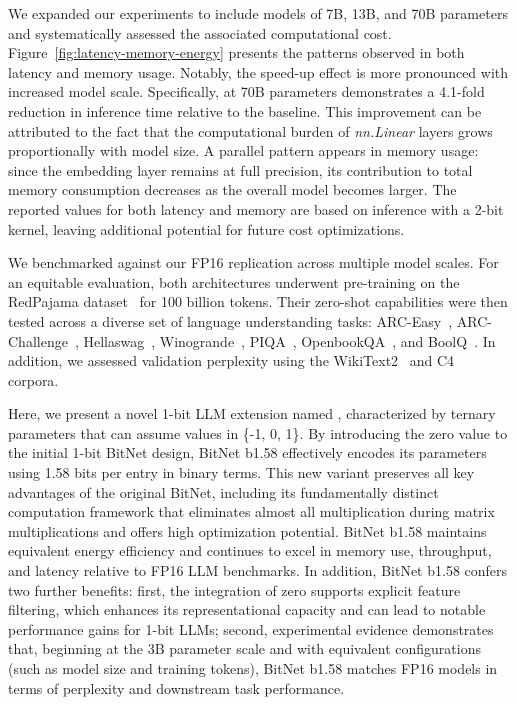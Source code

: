 We expanded our experiments to include models of 7B, 13B, and 70B parameters and systematically assessed the associated computational cost. Figure~\ref{fig:latency-memory-energy} presents the patterns observed in both latency and memory usage. Notably, the speed-up effect is more pronounced with increased model scale. Specifically,  at 70B parameters demonstrates a 4.1-fold reduction in inference time relative to the  baseline. This improvement can be attributed to the fact that the computational burden of \emph{nn.Linear} layers grows proportionally with model size. A parallel pattern appears in memory usage: since the embedding layer remains at full precision, its contribution to total memory consumption decreases as the overall model becomes larger. The reported values for both latency and memory are based on inference with a 2-bit kernel, leaving additional potential for future cost optimizations.

We benchmarked  against our FP16  replication across multiple model scales. For an equitable evaluation, both architectures underwent pre-training on the RedPajama dataset~\cite{redpajama} for 100 billion tokens. Their zero-shot capabilities were then tested across a diverse set of language understanding tasks: ARC-Easy~\cite{arc}, ARC-Challenge~\cite{arc}, Hellaswag~\cite{hellaswag}, Winogrande~\cite{winoGrande}, PIQA~\cite{piqa}, OpenbookQA~\cite{openbookqa}, and BoolQ~\cite{boolq}. In addition, we assessed validation perplexity using the WikiText2~\cite{wikitext2} and C4~\cite{c4} corpora.

Here, we present a novel 1-bit LLM extension named \textbf{}, characterized by ternary parameters that can assume values in \{-1, 0, 1\}. By introducing the zero value to the initial 1-bit BitNet design, BitNet b1.58 effectively encodes its parameters using 1.58 bits per entry in binary terms. This new variant preserves all key advantages of the original BitNet, including its fundamentally distinct computation framework that eliminates almost all multiplication during matrix multiplications and offers high optimization potential. BitNet b1.58 maintains equivalent energy efficiency and continues to excel in memory use, throughput, and latency relative to FP16 LLM benchmarks. In addition, BitNet b1.58 confers two further benefits: first, the integration of zero supports explicit feature filtering, which enhances its representational capacity and can lead to notable performance gains for 1-bit LLMs; second, experimental evidence demonstrates that, beginning at the 3B parameter scale and with equivalent configurations (such as model size and training tokens), BitNet b1.58 matches FP16 models in terms of perplexity and downstream task performance.

